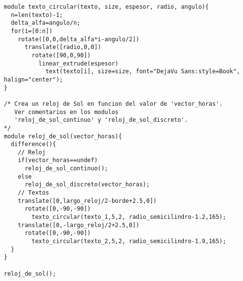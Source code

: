 \begin{lstlisting}
module texto_circular(texto, size, espesor, radio, angulo){
  n=len(texto)-1;
  delta_alfa=angulo/n;
  for(i=[0:n])
    rotate([0,0,delta_alfa*i-angulo/2])    
      translate([radio,0,0])
        rotate([90,0,90])
          linear_extrude(espesor)
            text(texto[i], size=size, font="DejaVu Sans:style=Book", halign="center");
}

/* Crea un reloj de Sol en funcion del valor de 'vector_horas'.
   Ver comentarios en los modulos
   'reloj_de_sol_continuo' y 'reloj_de_sol_discreto'.
*/
module reloj_de_sol(vector_horas){
  difference(){
    // Reloj
    if(vector_horas==undef)
      reloj_de_sol_continuo();
    else
      reloj_de_sol_discreto(vector_horas);
    // Textos
    translate([0,largo_reloj/2-borde+2.5,0])
      rotate([0,-90,-90])
        texto_circular(texto_1,5,2, radio_semicilindro-1.2,165);
    translate([0,-largo_reloj/2+2.5,0])
      rotate([0,-90,-90])
        texto_circular(texto_2,5,2, radio_semicilindro-1.9,165);
  }
}

reloj_de_sol();
\end{lstlisting}
